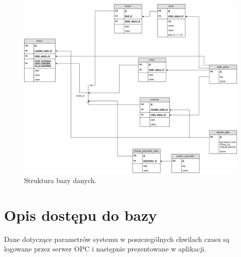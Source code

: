 \newpage
\begin{figure}[H]
	\centering
	\includegraphics[scale = 0.4]{fig/DB_SCHEMA.png}
	\caption{Struktura bazy danych.}
	\label{fig:db}
\end{figure}

\section{Opis dostępu do bazy}

Dane dotyczące parametrów systemu w poszczególnych chwilach czasu są logowane przez serwer OPC i następnie prezentowane w aplikacji.  